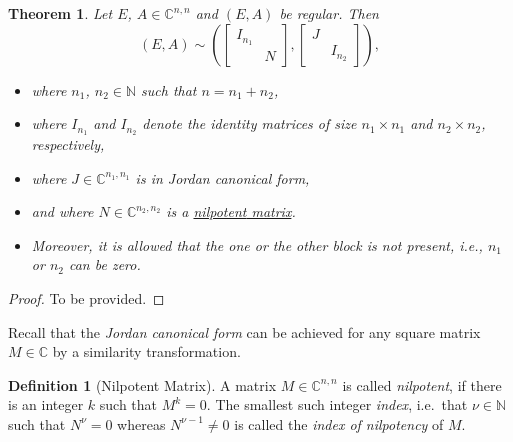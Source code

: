 \documentclass[]{book}
\providecommand{\tightlist}{%
  \setlength{\itemsep}{0pt}\setlength{\parskip}{0pt}}
\newtheorem{theorem}{Theorem}[chapter]
\theoremstyle{definition}
\newtheorem{definition}{Definition}[chapter]
\theoremstyle{definition}
\theoremstyle{definition}
\theoremstyle{definition}
\theoremstyle{remark}
\begin{document}
\begin{theorem}
\protect\hypertarget{thm:weierstrass-cf}{}{\label{thm:weierstrass-cf} }Let \(E\), \(A \in \mathbb C^{n,n}\) and \((E,A)\) be regular. Then
\begin{equation}
(E, A) \sim 
\left (
\begin{bmatrix}
I_{n_1} \\
& N
\end{bmatrix}
,
\begin{bmatrix}
J \\
& I_{n_2}
\end{bmatrix}
\right ),
\label{eq:weierstrass-cf}
\end{equation}

\begin{itemize}
\tightlist
\item
  where \(n_1\), \(n_2 \in \mathbb N\) such that \(n=n_1+n_2\),
\item
  where \(I_{n_1}\) and \(I_{n_2}\) denote the identity matrices of size \(n_1\times n_1\) and \(n_2\times n_2\), respectively,
\item
  where \(J\in \mathbb C^{n_1,n_1}\) is in \emph{Jordan canonical form},
\item
  and where \(N \in \mathbb C^{n_2,n_2}\) is a \protect\hyperlink{def:nilpotent-matrix}{\emph{nilpotent} matrix}.
\item
  Moreover, it is allowed that the one or the other block is not present, i.e., \(n_1\) or \(n_2\) can be zero.
\end{itemize}
\end{theorem}

\begin{proof}
{}To be provided.
\end{proof}

Recall that the \emph{Jordan canonical form} can be achieved for any square matrix \(M\in \mathbb C\) by a similarity transformation.

\begin{definition}[Nilpotent Matrix]
\protect\hypertarget{def:nilpotent-matrix}{}{\label{def:nilpotent-matrix} {} }A matrix \(M\in \mathbb C^{n,n}\) is called \emph{nilpotent}, if there is an integer \(k\) such that \(M^k=0\). The smallest such integer \emph{index}, i.e.~that \(\nu \in \mathbb N\) such that \(N^\nu=0\) whereas \(N^{\nu-1} \neq 0\) is called the \emph{index of nilpotency} of \(M\).
\end{definition}
\end{document}
